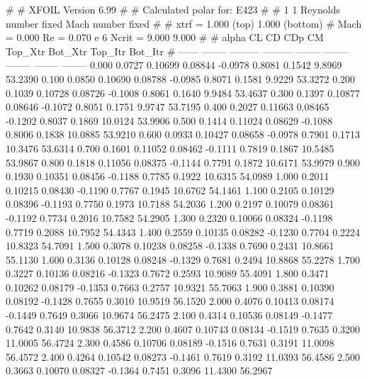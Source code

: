 #  
#       XFOIL         Version 6.99
#  
# Calculated polar for: E423                                            
#  
# 1 1 Reynolds number fixed          Mach number fixed         
#  
# xtrf =   1.000 (top)        1.000 (bottom)  
# Mach =   0.000     Re =     0.070 e 6     Ncrit =   9.000  9.000
#  
#   alpha    CL        CD       CDp       CM     Top_Xtr  Bot_Xtr  Top_Itr  Bot_Itr
#  ------ -------- --------- --------- -------- -------- -------- -------- --------
   0.000   0.0727   0.10699   0.08844  -0.0978   0.8081   0.1542   9.8969  53.2390
   0.100   0.0850   0.10690   0.08788  -0.0985   0.8071   0.1581   9.9229  53.3272
   0.200   0.1039   0.10728   0.08726  -0.1008   0.8061   0.1640   9.9484  53.4637
   0.300   0.1397   0.10877   0.08646  -0.1072   0.8051   0.1751   9.9747  53.7195
   0.400   0.2027   0.11663   0.08465  -0.1202   0.8037   0.1869  10.0124  53.9906
   0.500   0.1414   0.11024   0.08629  -0.1088   0.8006   0.1838  10.0885  53.9210
   0.600   0.0933   0.10427   0.08658  -0.0978   0.7901   0.1713  10.3476  53.6314
   0.700   0.1601   0.11052   0.08462  -0.1111   0.7819   0.1867  10.5485  53.9867
   0.800   0.1818   0.11056   0.08375  -0.1144   0.7791   0.1872  10.6171  53.9979
   0.900   0.1930   0.10351   0.08456  -0.1188   0.7785   0.1922  10.6315  54.0989
   1.000   0.2011   0.10215   0.08430  -0.1190   0.7767   0.1945  10.6762  54.1461
   1.100   0.2105   0.10129   0.08396  -0.1193   0.7750   0.1973  10.7188  54.2036
   1.200   0.2197   0.10079   0.08361  -0.1192   0.7734   0.2016  10.7582  54.2905
   1.300   0.2320   0.10066   0.08324  -0.1198   0.7719   0.2088  10.7952  54.4343
   1.400   0.2559   0.10135   0.08282  -0.1230   0.7704   0.2224  10.8323  54.7091
   1.500   0.3078   0.10238   0.08258  -0.1338   0.7690   0.2431  10.8661  55.1130
   1.600   0.3136   0.10128   0.08248  -0.1329   0.7681   0.2494  10.8868  55.2278
   1.700   0.3227   0.10136   0.08216  -0.1323   0.7672   0.2593  10.9089  55.4091
   1.800   0.3471   0.10262   0.08179  -0.1353   0.7663   0.2757  10.9321  55.7063
   1.900   0.3881   0.10390   0.08192  -0.1428   0.7655   0.3010  10.9519  56.1520
   2.000   0.4076   0.10413   0.08174  -0.1449   0.7649   0.3066  10.9674  56.2475
   2.100   0.4314   0.10536   0.08149  -0.1477   0.7642   0.3140  10.9838  56.3712
   2.200   0.4607   0.10743   0.08134  -0.1519   0.7635   0.3200  11.0005  56.4724
   2.300   0.4586   0.10706   0.08189  -0.1516   0.7631   0.3191  11.0098  56.4572
   2.400   0.4264   0.10542   0.08273  -0.1461   0.7619   0.3192  11.0393  56.4586
   2.500   0.3663   0.10070   0.08327  -0.1364   0.7451   0.3096  11.4300  56.2967
